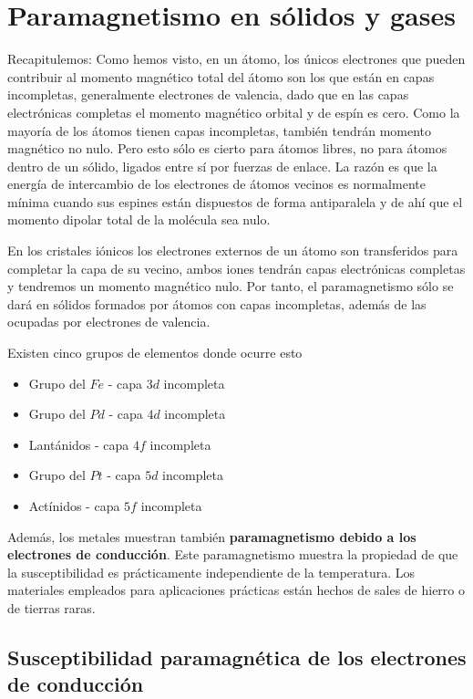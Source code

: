 \section{Paramagnetismo en sólidos y gases}

Recapitulemos: Como hemos visto, en un átomo, los únicos electrones que pueden contribuir al momento magnético total del átomo son los que están en capas incompletas, generalmente electrones de valencia, dado que en las capas electrónicas completas el momento magnético orbital y de espín es cero. Como la mayoría de los átomos tienen capas incompletas, también tendrán momento magnético no nulo. Pero esto sólo es cierto para átomos libres, no para átomos dentro de un sólido, ligados entre sí por fuerzas de enlace. La razón es que la energía de intercambio de los electrones de átomos vecinos es normalmente mínima cuando sus espines están dispuestos de forma antiparalela y de ahí que el momento dipolar total de la molécula sea nulo.

En los cristales iónicos los electrones externos de un átomo son transferidos para completar la capa de su vecino, ambos iones tendrán capas electrónicas completas y tendremos un momento magnético nulo. Por tanto, el paramagnetismo sólo se dará en sólidos formados por átomos con capas incompletas, además de las ocupadas por electrones de valencia.

Existen cinco grupos de elementos donde ocurre esto

\begin{itemize}
	\item Grupo del $Fe$ - capa $3d$ incompleta
	\item Grupo del $Pd$ - capa $4d$ incompleta
	\item Lantánidos - capa $4f$ incompleta
	\item Grupo del $Pt$ - capa $5d$ incompleta
	\item Actínidos - capa $5f$ incompleta
\end{itemize}

Además, los metales muestran también \textbf{paramagnetismo debido a los electrones de conducción}. Este paramagnetismo muestra la propiedad de que la susceptibilidad es prácticamente independiente de la temperatura. Los materiales empleados para aplicaciones prácticas están hechos de sales de hierro o de tierras raras.

\subsection{Susceptibilidad paramagnética de los electrones de conducción}

